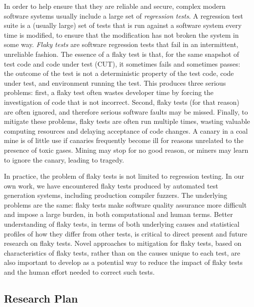 \documentclass[10pt]{article}
\begin{document}
In order to help ensure that they are reliable and secure, complex modern software systems usually include a large set of \emph{regression tests}.  A regression test suite is a (usually large) set of tests that is run against a software system every time is modified, to ensure that the modification has not broken the system in some way.
\emph{Flaky tests} \cite{miccoflaky} are software regression tests that fail in an intermittent, unreliable fashion.  The essence of a flaky test is that, for the same snapshot of test code and code under test (CUT), it sometimes fails and sometimes passes:  the outcome of the test is not a deterministic property of the test code, code under test, and environment running the test.  This produces three serious problems:  first, a flaky test often wastes developer time by forcing the investigation of code that is not incorrect.  Second, flaky tests (for that reason) are often ignored, and therefore serious software faults may be missed.  Finally, to mitigate these problems, flaky tests are often run multiple times, wasting valuable computing resources and delaying acceptance of code changes.  A canary in a coal mine is of little use if canaries frequently become ill for reasons unrelated to the presence of toxic gases.  Mining may stop for no good reason, or miners may learn to ignore the canary, leading to tragedy.

In practice, the problem of flaky tests is not limited to regression testing.  In our own work, we have encountered flaky tests produced by automated test generation systems, including production compiler fuzzers.  The underlying problems are the same:  flaky tests make software quality assurance more difficult and impose a large burden, in both computational and human terms.  Better understanding of flaky tests, in terms of both underlying causes and statistical profiles of how they differ from other tests, is critical to direct present and future research on flaky tests.  Novel approaches to mitigation for flaky tests, based on characteristics of flaky tests, rather than on the causes unique to each test, are also important to develop as a potential way to reduce the impact of flaky tests and the human effort needed to correct such tests.

\subsection{Research Plan}
\end{document}
